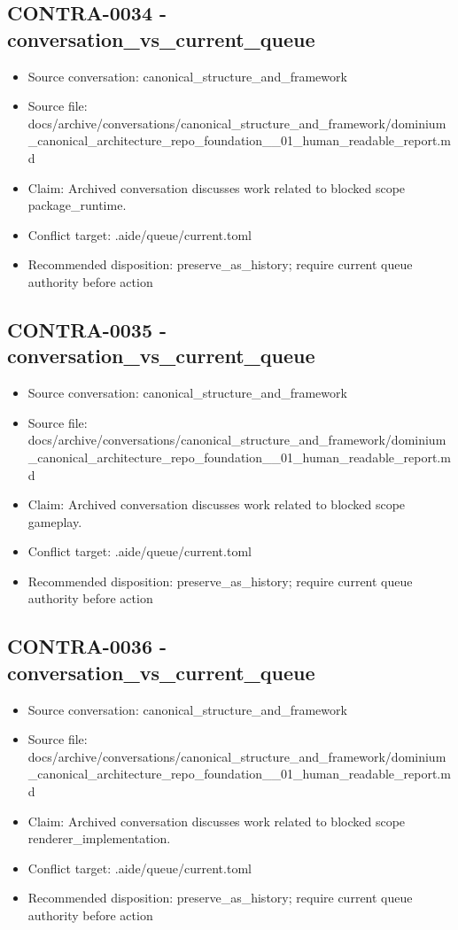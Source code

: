 \documentclass[11pt,a4paper]{report}
\begin{document}
\subsection{CONTRA-0034 - conversation\_vs\_current\_queue}

\begin{itemize}
\item Source conversation: canonical\_structure\_and\_framework
\item Source file: docs/archive/conversations/canonical\_structure\_and\_framework/dominium\_canonical\_architecture\_repo\_foundation\_\_01\_human\_readable\_report.md
\item Claim: Archived conversation discusses work related to blocked scope package\_runtime.
\item Conflict target: .aide/queue/current.toml
\item Recommended disposition: preserve\_as\_history; require current queue authority before action
\end{itemize}

\subsection{CONTRA-0035 - conversation\_vs\_current\_queue}

\begin{itemize}
\item Source conversation: canonical\_structure\_and\_framework
\item Source file: docs/archive/conversations/canonical\_structure\_and\_framework/dominium\_canonical\_architecture\_repo\_foundation\_\_01\_human\_readable\_report.md
\item Claim: Archived conversation discusses work related to blocked scope gameplay.
\item Conflict target: .aide/queue/current.toml
\item Recommended disposition: preserve\_as\_history; require current queue authority before action
\end{itemize}

\subsection{CONTRA-0036 - conversation\_vs\_current\_queue}

\begin{itemize}
\item Source conversation: canonical\_structure\_and\_framework
\item Source file: docs/archive/conversations/canonical\_structure\_and\_framework/dominium\_canonical\_architecture\_repo\_foundation\_\_01\_human\_readable\_report.md
\item Claim: Archived conversation discusses work related to blocked scope renderer\_implementation.
\item Conflict target: .aide/queue/current.toml
\item Recommended disposition: preserve\_as\_history; require current queue authority before action
\end{itemize}
\end{document}
